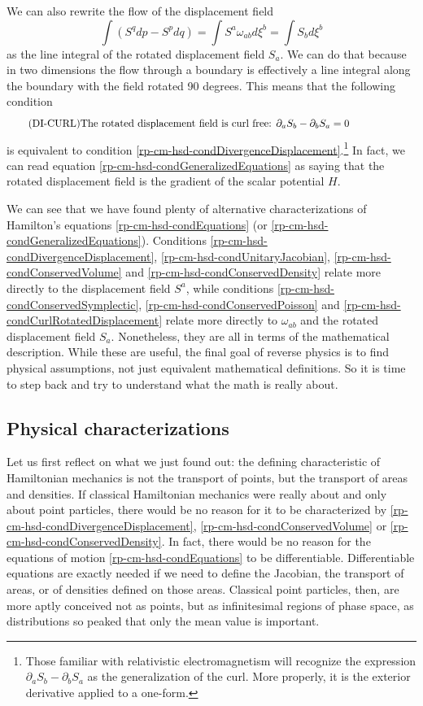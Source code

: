 We can also rewrite the flow of the displacement field
\begin{equation}
	\int \left( S^q dp - S^p dq \right) = \int S^a \omega_{ab} d\xi^b = \int S_b d\xi^b
\end{equation}
as the line integral of the rotated displacement field $S_a$. We can do that because in two dimensions the flow through a boundary is effectively a line integral along the boundary with the field rotated 90 degrees. This means that the following condition
\begin{equation}\label{rp-cm-hsd-condCurlRotatedDisplacement}
	\tag{DI-CURL}
	\eqtext{The rotated displacement field is curl free: $\partial_a S_b - \partial_b S_a = 0$} 
\end{equation}
is equivalent to condition \ref{rp-cm-hsd-condDivergenceDisplacement}.\footnote{Those familiar with relativistic electromagnetism will recognize the expression $\partial_a S_b - \partial_b S_a$ as the generalization of the curl. More properly, it is the exterior derivative applied to a one-form.} In fact, we can read equation \ref{rp-cm-hsd-condGeneralizedEquations} as saying that the rotated displacement field is the gradient of the scalar potential $H$.

We can see that we have found plenty of alternative characterizations of Hamilton's equations \ref{rp-cm-hsd-condEquations} (or \ref{rp-cm-hsd-condGeneralizedEquations}). Conditions  \ref{rp-cm-hsd-condDivergenceDisplacement}, \ref{rp-cm-hsd-condUnitaryJacobian}, \ref{rp-cm-hsd-condConservedVolume} and \ref{rp-cm-hsd-condConservedDensity} relate more directly to the displacement field $S^a$, while conditions \ref{rp-cm-hsd-condConservedSymplectic}, \ref{rp-cm-hsd-condConservedPoisson} and \ref{rp-cm-hsd-condCurlRotatedDisplacement} relate more directly to $\omega_{ab}$ and the rotated displacement field $S_a$. Nonetheless, they are all in terms of the mathematical description. While these are useful, the final goal of reverse physics is to find physical assumptions, not just equivalent mathematical definitions. So it is time to step back and try to understand what the math is really about.

\subsection{Physical characterizations}

Let us first reflect on what we just found out: the defining characteristic of Hamiltonian mechanics is not the transport of points, but the transport of areas and densities. If classical Hamiltonian mechanics were really about and only about point particles, there would be no reason for it to be characterized by \ref{rp-cm-hsd-condDivergenceDisplacement}, \ref{rp-cm-hsd-condConservedVolume} or \ref{rp-cm-hsd-condConservedDensity}. In fact, there would be no reason for the equations of motion \ref{rp-cm-hsd-condEquations} to be differentiable. Differentiable equations are exactly needed if we need to define the Jacobian, the transport of areas, or of densities defined on those areas. Classical point particles, then, are more aptly conceived not as points, but as infinitesimal regions of phase space, as distributions so peaked that only the mean value is important.

